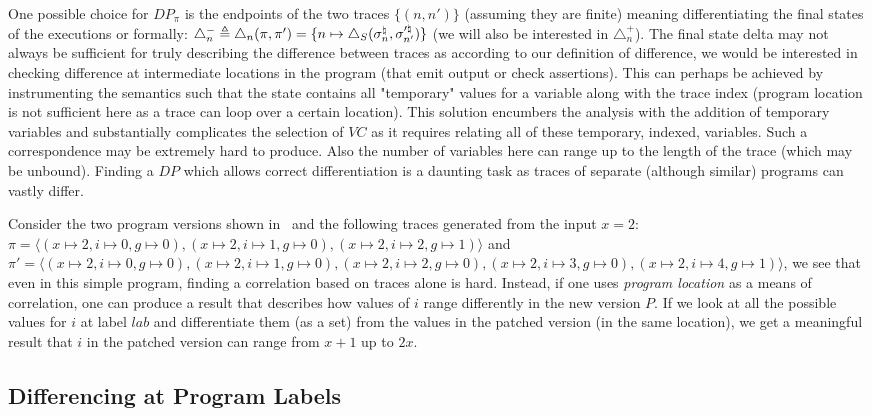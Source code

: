 One possible choice for $DP_{\pi}$ is the endpoints of the two traces $\{(n,n')\}$ (assuming they are finite) meaning differentiating the final states of the executions or formally: $\triangle_{n}^{-} \triangleq \triangle_{n}(\pi,\pi') = \{n \mapsto \triangle_{S}(\sigma^\natural_{n},\sigma'^\natural_{n'})\}$ (we will also be interested in $\triangle_{n}^{+}$). The final state delta may not always be sufficient for truly describing the difference between traces as according to our definition of difference, we would be interested in checking difference at intermediate locations in the program (that emit output or check assertions). This can perhaps be achieved by instrumenting the semantics such that the state contains all "temporary" values for a variable along with the trace index (program location is not sufficient here as a trace can loop over a certain location). This solution encumbers the analysis with the addition of temporary variables and substantially complicates the selection of $VC$ as it requires relating all of these temporary, indexed, variables. Such a correspondence may be extremely hard to produce. Also the number of variables here can range up to the length of the trace (which may be unbound). Finding a $DP$ which allows correct differentiation is a daunting task as traces of separate (although similar) programs can vastly differ.

\begin{Example}
Consider the two program versions shown in~ and the following traces generated from the input $x=2$: $\pi = \langle (x \mapsto 2,i \mapsto 0, g \mapsto 0),(x \mapsto 2,i \mapsto 1, g \mapsto 0),(x \mapsto 2,i \mapsto 2, g \mapsto 1) \rangle$ and $\pi' = \langle (x \mapsto 2,i \mapsto 0, g \mapsto 0),(x \mapsto 2,i \mapsto 1, g \mapsto 0),(x \mapsto 2,i \mapsto 2, g \mapsto 0),(x \mapsto 2,i \mapsto 3, g \mapsto 0),(x \mapsto 2,i \mapsto 4, g \mapsto 1)\rangle$, we see that even in this simple program, finding a correlation based on traces alone is hard.
Instead, if one uses \emph{program location} as a means of correlation, one can produce a result that describes how values of $i$ range differently in the new version $P$. If we look at all the possible values for $i$ at label $lab$ and differentiate them (as a set) from the values in the patched version (in the same location), we get a meaningful result that $i$ in the patched version can range from $x+1$ up to $2x$.
\end{Example}


\subsection{Differencing at Program Labels} 

